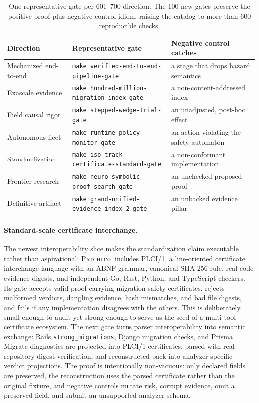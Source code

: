 \documentclass[11pt]{article}
\newcommand{\tool}{\textsc{Patchline}}
\newcommand{\code}[1]{\texttt{#1}}
\newcommand{\gate}[1]{\texttt{make #1}}
\begin{document}
\begin{table}[t]
\centering
\small
\begin{tabular}{@{}lll@{}}
\toprule
\textbf{Direction} & \textbf{Representative gate} & \textbf{Negative control catches} \\
\midrule
Mechanized end-to-end & \gate{verified-end-to-end-pipeline-gate} & a stage that drops hazard semantics \\
Exascale evidence & \gate{hundred-million-migration-index-gate} & a non-content-addressed index \\
Field causal rigor & \gate{stepped-wedge-trial-gate} & an unadjusted, post-hoc effect \\
Autonomous fleet & \gate{runtime-policy-monitor-gate} & an action violating the safety automaton \\
Standardization & \gate{iso-track-certificate-standard-gate} & a non-conformant implementation \\
Frontier research & \gate{neuro-symbolic-proof-search-gate} & an unchecked proposed proof \\
Definitive artifact & \gate{grand-unified-evidence-index-2-gate} & an unbacked evidence pillar \\
\bottomrule
\end{tabular}
\caption{One representative gate per 601--700 direction. The 100 new gates preserve the
positive-proof-plus-negative-control idiom, raising the catalog to more than 600 reproducible checks.}
\label{tab:frontier4}
\end{table}

\paragraph{Standard-scale certificate interchange.}
The newest interoperability slice makes the standardization claim executable rather than aspirational:
\tool{} includes PLCI/1, a line-oriented certificate interchange language with an ABNF grammar,
canonical SHA-256 rule, real-code evidence digests, and independent Go, Rust, Python, and TypeScript
checkers. Its gate accepts valid proof-carrying migration-safety certificates, rejects malformed
verdicts, dangling evidence, hash mismatches, and bad file digests, and fails if any implementation
disagrees with the others. This is deliberately small enough to audit yet strong enough to serve as the
seed of a multi-tool certificate ecosystem. The next gate turns parser interoperability into semantic
exchange: Rails \code{strong\_migrations}, Django migration checks, and Prisma Migrate diagnostics are
projected into PLCI/1 certificates, parsed with real repository digest verification, and reconstructed
back into analyzer-specific verdict projections. The proof is intentionally non-vacuous: only declared
fields are preserved, the reconstruction uses the parsed certificate rather than the original fixture,
and negative controls mutate risk, corrupt evidence, omit a preserved field, and submit an unsupported
analyzer schema.
\end{document}
